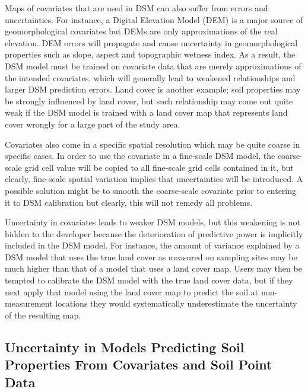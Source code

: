 \documentclass[10pt,b5paper,]{book}
\theoremstyle{definition}
\theoremstyle{definition}
\theoremstyle{definition}
\theoremstyle{remark}
\begin{document}
Maps of covariates that are used in DSM can also suffer from errors and
uncertainties. For instance, a Digital Elevation Model (DEM) is a major
source of geomorphological covariates but DEMs are only approximations
of the real elevation. DEM errors will propagate and cause uncertainty
in geomorphological properties such as slope, aspect and topographic
wetness index. As a result, the DSM model must be trained on covariate
data that are merely approximations of the intended covariates, which
will generally lead to weakened relationships and larger DSM prediction
errors. Land cover is another example; soil properties may be strongly
influenced by land cover, but such relationship may come out quite weak
if the DSM model is trained with a land cover map that represents land
cover wrongly for a large part of the study area.

Covariates also come in a specific spatial resolution which may be quite
coarse in specific cases. In order to use the covariate in a fine-scale
DSM model, the coarse-scale grid cell value will be copied to all
fine-scale grid cells contained in it, but clearly, fine-scale spatial
variation implies that uncertainties will be introduced. A possible
solution might be to smooth the coarse-scale covariate prior to entering
it to DSM calibration but clearly, this will not remedy all problems.

Uncertainty in covariates leads to weaker DSM models, but this weakening
is not hidden to the developer because the deterioration of predictive
power is implicitly included in the DSM model. For instance, the amount
of variance explained by a DSM model that uses the true land cover as
measured on sampling sites may be much higher than that of a model that
uses a land cover map. Users may then be tempted to calibrate the DSM
model with the true land cover data, but if they next apply that model
using the land cover map to predict the soil at non-measurement
locations they would systematically underestimate the uncertainty of the
resulting map.

\hypertarget{uncertainty-in-models-predicting-soil-properties-from-covariates-and-soil-point-data}{%
\subsection{Uncertainty in Models Predicting Soil Properties From
Covariates and Soil Point
Data}\label{uncertainty-in-models-predicting-soil-properties-from-covariates-and-soil-point-data}}
\end{document}
